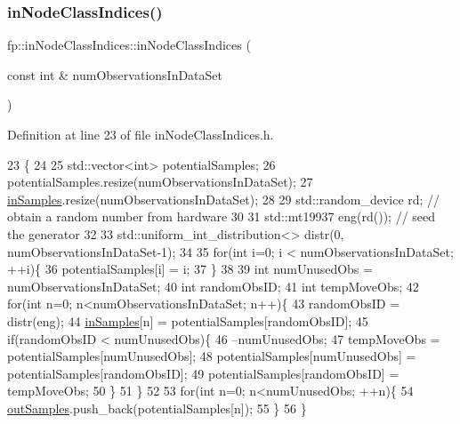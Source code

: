 \subsubsection{\texorpdfstring{in\+Node\+Class\+Indices()}{inNodeClassIndices()}\hspace{0.1cm}{\footnotesize\ttfamily [2/2]}}
{\footnotesize\ttfamily fp\+::in\+Node\+Class\+Indices\+::in\+Node\+Class\+Indices (\begin{DoxyParamCaption}\item[{const int \&}]{num\+Observations\+In\+Data\+Set }\end{DoxyParamCaption})\hspace{0.3cm}{\ttfamily [inline]}}



Definition at line 23 of file in\+Node\+Class\+Indices.\+h.


\begin{DoxyCode}
23                                                                    \{
24 
25                 std::vector<int> potentialSamples;
26                 potentialSamples.resize(numObservationsInDataSet);
27                 \hyperlink{classfp_1_1inNodeClassIndices_ae830eec1ee5490f4fe4fb3d579ac78eb}{inSamples}.resize(numObservationsInDataSet);
28 
29                 std::random\_device rd; \textcolor{comment}{// obtain a random number from hardware}
30 
31                 std::mt19937 eng(rd()); \textcolor{comment}{// seed the generator}
32 
33                 std::uniform\_int\_distribution<> distr(0, numObservationsInDataSet-1);
34 
35                 \textcolor{keywordflow}{for}(\textcolor{keywordtype}{int} i=0; i < numObservationsInDataSet; ++i)\{
36                     potentialSamples[i] = i;
37                 \}
38 
39                 \textcolor{keywordtype}{int} numUnusedObs = numObservationsInDataSet;
40                 \textcolor{keywordtype}{int} randomObsID;
41                 \textcolor{keywordtype}{int} tempMoveObs;
42                 \textcolor{keywordflow}{for}(\textcolor{keywordtype}{int} n=0; n<numObservationsInDataSet; n++)\{
43                     randomObsID = distr(eng);
44                     \hyperlink{classfp_1_1inNodeClassIndices_ae830eec1ee5490f4fe4fb3d579ac78eb}{inSamples}[n] = potentialSamples[randomObsID];
45                     \textcolor{keywordflow}{if}(randomObsID < numUnusedObs)\{
46                         --numUnusedObs;
47                         tempMoveObs = potentialSamples[numUnusedObs];
48                         potentialSamples[numUnusedObs] = potentialSamples[randomObsID];
49                         potentialSamples[randomObsID] = tempMoveObs;
50                     \}
51                 \}
52 
53                 \textcolor{keywordflow}{for}(\textcolor{keywordtype}{int} n=0; n<numUnusedObs; ++n)\{
54                     \hyperlink{classfp_1_1inNodeClassIndices_afaa76dfa346ba9de197b1cbd7a1557f9}{outSamples}.push\_back(potentialSamples[n]);
55                 \}
56             \}       
\end{DoxyCode}


